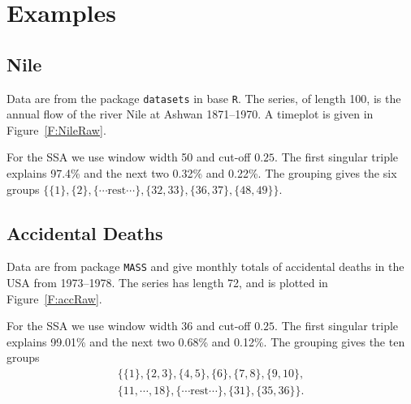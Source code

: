 \documentclass[11pt]{amsart}
\theoremstyle{plain}
\theoremstyle{definition}
\theoremstyle{remark}
\begin{document}
\section{Examples}
\subsection{Nile}
Data are from the package \texttt{datasets} in base \texttt{R}. The series, of length 100, is the annual flow of the river Nile at Ashwan 1871--1970. A timeplot is given in Figure~\ref{F:NileRaw}.
\begin{center}
\end{center}
For the SSA we use window width 50 and cut-off \(0.25\). The first singular triple explains 97.4\% and the next two 0.32\% and 0.22\%. The grouping
gives the six groups \(\{\{1\},\{2\},\{\cdots\text{rest}\cdots\},\{32,33\},\{36,37\},\{48,49\}\}\).
\begin{center}
\end{center}

\subsection{Accidental Deaths}
Data are from package \texttt{MASS} and give monthly totals of accidental deaths in the USA from 1973--1978. The series has length 72, and is plotted in Figure~\ref{F:accRaw}.
\begin{center}
\end{center}
For the SSA we use window width 36 and cut-off \(0.25\). The first singular triple explains 99.01\% and the next two 0.68\% and 0.12\%. The grouping
gives the ten groups 
\begin{multline*}
\{\{1\},\{2,3\},\{4,5\},\{6\},\{7,8\},\{9,10\},\\\{11,\cdots,18\},\{\cdots\text{rest}\cdots\},\{31\},\{35,36\}\}.
\end{multline*}
\begin{center}
\end{center}
%
\end{document}
